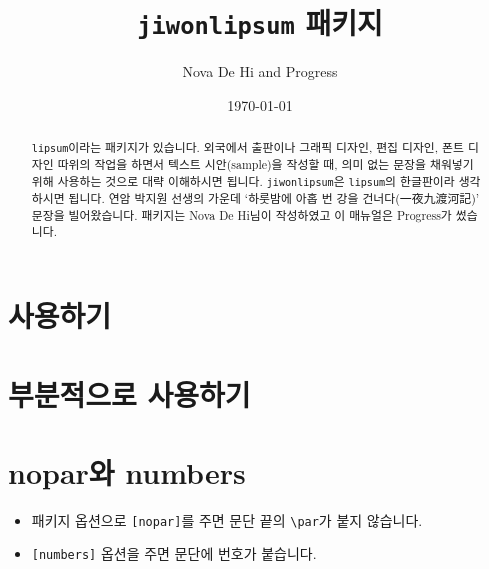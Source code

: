 \documentclass[a4paper,hcr]{oblivoir}
\begin{document}
\title{\texttt{jiwonlipsum} 패키지}
\author{Nova De Hi and Progress}
\date{\today}

\maketitle

\begin{abstract}
\texttt{lipsum}이라는 패키지가 있습니다. 외국에서 출판이나 그래픽 디자인, 편집 디자인, 폰트 디자인 따위의 작업을 하면서 텍스트 시안(sample)을 작성할 때, 의미 없는 문장을 채워넣기 위해 사용하는 것으로 대략 이해하시면 됩니다.  \texttt{jiwonlipsum}은 \texttt{lipsum}의 한글판이라 생각하시면 됩니다. 연암 박지원 선생의  가운데 `하룻밤에 아홉 번 강을 건너다(一夜九渡河記)' 문장을 빌어왔습니다. 패키지는 Nova De Hi님이 작성하였고 이 매뉴얼은 Progress가 썼습니다.
\end{abstract}

\tableofcontents*

\section{사용하기}

\begin{boxedverbatim}
\jiwon
\end{boxedverbatim}

\jiwon

\section{부분적으로 사용하기}

\begin{boxedverbatim}
\jiwon[1-12]
\end{boxedverbatim}

\jiwon[1-12]

\begin{boxedverbatim}
\jiwon[13-20]
\end{boxedverbatim}

\jiwon[13-20]

\begin{boxedverbatim}
\jiwon[21-28]
\end{boxedverbatim}

\jiwon[21-28]

\begin{boxedverbatim}
\jiwon[15]
\end{boxedverbatim}

\jiwon[15]

\begin{boxedverbatim}
\jiwon[23]
\end{boxedverbatim}

\jiwon[23]

\section{nopar와 numbers}

\begin{itemize}
\item 패키지 옵션으로 \texttt{[nopar]}를 주면 문단 끝의 \verb|\par|가 붙지 않습니다.

\item \texttt{[numbers]} 옵션을 주면 문단에 번호가 붙습니다.
\end{itemize}
\end{document}
